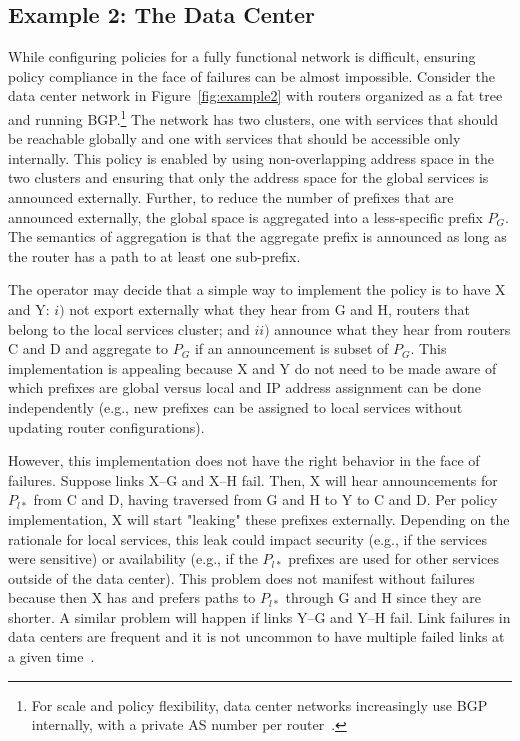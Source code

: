 \subsection{Example 2:  The Data Center}

 While configuring policies for a fully functional network is difficult, ensuring policy compliance in the face of failures can be almost impossible. Consider the data center network in Figure~\ref{fig:example2} with routers organized as a fat tree and running BGP.\footnote{For scale and policy flexibility, data center networks increasingly use BGP internally, with a private AS number per router~\cite{bgp-in-dc}.} The network has two clusters, one with services that should be reachable globally and one with services that should be accessible only internally. This policy is enabled by using non-overlapping address space in the two clusters and ensuring that only the address space for the global services is announced externally. Further, to reduce the number of prefixes that are announced externally, the global space is aggregated into a less-specific prefix $P_G$. The semantics of aggregation is that the aggregate prefix is announced as long as the router has a path to at least one sub-prefix.

The operator may decide that a simple way to implement the policy is to have X and Y: $i)$ not export externally what they hear from G and H, routers that belong to the local services cluster; and $ii)$ announce what they hear from routers C and D and aggregate to $P_G$ if an announcement is subset of $P_G$. This implementation is appealing because X and Y do not need to be made aware of which prefixes are global versus local and IP address assignment can be done independently (e.g., new prefixes can be assigned to local services without updating router configurations).

However, this implementation does not have the right behavior in the face of failures. Suppose links X--G and X--H fail. Then, X will hear announcements for $P_{l*}$ from C and D, having traversed from G and H to Y to C and D. Per policy implementation, X will start "leaking" these prefixes externally. Depending on the rationale for local services, this leak could impact security (e.g., if the services were sensitive) or availability (e.g., if the $P_{l*}$ prefixes are used for other services outside of the data center). This problem does not manifest without failures because then X has and prefers paths to $P_{l*}$ through G and H since they are shorter. A similar problem will happen if links Y--G and Y--H fail.
Link failures in data centers are frequent and it is not uncommon to have multiple failed links at a given time~\cite{dc-failure-study}.

